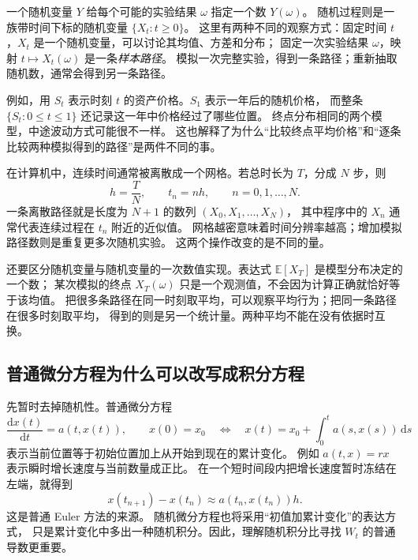 \documentclass[11pt,a4paper,fontset=none]{ctexart}
\numberwithin{equation}{section}
\newcommand{\E}{\mathbb E}
\begin{document}
一个随机变量 $Y$ 给每个可能的实验结果 $\omega$ 指定一个数 $Y(\omega)$。
随机过程则是一族带时间下标的随机变量 $\{X_t:t\geq 0\}$。
这里有两种不同的观察方式：固定时间 $t$，$X_t$ 是一个随机变量，可以讨论其均值、方差和分布；
固定一次实验结果 $\omega$，映射 $t\mapsto X_t(\omega)$ 是一条\emph{样本路径}。
模拟一次完整实验，得到一条路径；重新抽取随机数，通常会得到另一条路径。

例如，用 $S_t$ 表示时刻 $t$ 的资产价格。$S_1$ 表示一年后的随机价格，
而整条 $\{S_t:0\leq t\leq 1\}$ 还记录这一年中价格经过了哪些位置。
终点分布相同的两个模型，中途波动方式可能很不一样。
这也解释了为什么“比较终点平均价格”和“逐条比较两种模拟得到的路径”是两件不同的事。

在计算机中，连续时间通常被离散成一个网格。若总时长为 $T$，分成 $N$ 步，则
\begin{equation}
  h=\frac{T}{N},\qquad t_n=nh,\qquad n=0,1,\ldots,N.
  \label{bg:eq:grid}
\end{equation}
一条离散路径就是长度为 $N+1$ 的数列 $(X_0,X_1,\ldots,X_N)$，
其中程序中的 $X_n$ 通常代表连续过程在 $t_n$ 附近的近似值。
网格越密意味着时间分辨率越高；增加模拟路径数则是重复更多次随机实验。
这两个操作改变的是不同的量。

还要区分随机变量与随机变量的一次数值实现。表达式 $\E[X_T]$ 是模型分布决定的一个数；
某次模拟的终点 $X_T(\omega)$ 只是一个观测值，不会因为计算正确就恰好等于该均值。
把很多条路径在同一时刻取平均，可以观察平均行为；把同一条路径在很多时刻取平均，
得到的则是另一个统计量。两种平均不能在没有依据时互换。

\subsection{普通微分方程为什么可以改写成积分方程}
\label{bg:sub:ode}

先暂时去掉随机性。普通微分方程
\begin{equation}
  \frac{\mathrm dx(t)}{\mathrm dt}=a(t,x(t)),\qquad x(0)=x_0
  \quad\Longleftrightarrow\quad
  x(t)=x_0+\int_0^t a(s,x(s))\,\mathrm ds
  \label{bg:eq:ode}
\end{equation}
表示当前位置等于初始位置加上从开始到现在的累计变化。
例如 $a(t,x)=rx$ 表示瞬时增长速度与当前数量成正比。
在一个短时间段内把增长速度暂时冻结在左端，就得到
\begin{equation}
  x(t_{n+1})-x(t_n)\approx a(t_n,x(t_n))h.
  \label{bg:eq:ode-euler}
\end{equation}
这是普通 Euler 方法的来源。
随机微分方程也将采用“初值加累计变化”的表达方式，
只是累计变化中多出一种随机积分。因此，理解随机积分比寻找 $W_t$ 的普通导数更重要。
\end{document}

